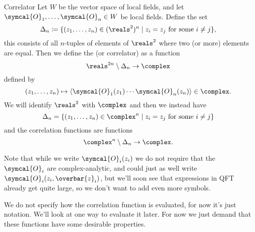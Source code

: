 \documentclass[fleqn]{NotesClass}
\newcommand{\quantumField}[1]{\symcal{#1}}
\DeclarePairedDelimiter{\correlator}{\langle}{\rangle}
\begin{document}
    \begin{dfn}{Correlator}{}
        Let \(W\) be the vector space of local fields, and let \(\quantumField{O}_1, \dotsc, \quantumField{O}_n \in W\) be local fields.
        Define the set
        \begin{equation}
            \Delta_n \coloneqq \{(z_1, \dotsc, z_n) \in (\reals^2)^n \mid z_i = z_j \text{ for some } i \ne j\},
        \end{equation}
        this consists of all \(n\)-tuples of elements of \(\reals^2\) where two (or more) elements are equal.
        Then we define the  (or correlator) as a function
        \begin{equation}
            \reals^{2n} \setminus \Delta_n \to \complex
        \end{equation}
        defined by
        \begin{equation}
            (z_1, \dotsc, z_n) \mapsto \correlator{\quantumField{O}_1(z_1) \dotsm \quantumField{O}_n(z_n)} \in \complex.
        \end{equation}
        We will identify \(\reals^2\) with \(\complex\) and then we instead have
        \begin{equation}
            \Delta_n = \{(z_1, \dotsc, z_n) \in \complex^n \mid z_i = z_j \text{ for some } i \ne j\}
        \end{equation}
        and the correlation functions are functions
        \begin{equation}
            \complex^n \setminus \Delta_n \to \complex.
        \end{equation}
    \end{dfn}
    
    Note that while we write \(\quantumField{O}_i(z_i)\) we do not require that the \(\quantumField{O}_i\) are complex-analytic, and could just as well write \(\quantumField{O}_i(z_i, \overbar{z}_i)\), but we'll soon see that expressions in QFT already get quite large, so we don't want to add even more symbols.
    
    We do not specify how the correlation function is evaluated, for now it's just notation.
    We'll look at one way to evaluate it later.
    For now we just demand that these functions have some desirable properties.
    
\end{document}
